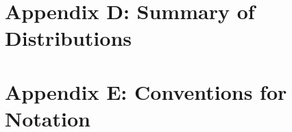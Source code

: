 \documentclass[
]{book}
\begin{document}
\hypertarget{appendix-d-summary-of-distributions}{%
\chapter{Appendix D: Summary of Distributions}\label{appendix-d-summary-of-distributions}}

\hypertarget{appendix-e-conventions-for-notation}{%
\chapter{Appendix E: Conventions for Notation}\label{appendix-e-conventions-for-notation}}

\hypertarget{section}{%
\chapter*{}\label{section}}
\end{document}
